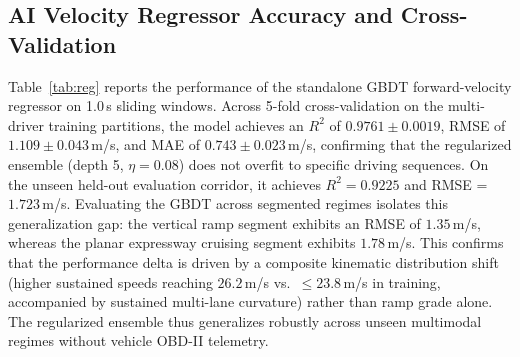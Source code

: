 \documentclass[conference]{IEEEtran}
\begin{document}
\subsection{AI Velocity Regressor Accuracy and Cross-Validation}
Table~\ref{tab:reg} reports the performance of the standalone GBDT forward-velocity regressor on 1.0\,s sliding windows. Across 5-fold cross-validation on the multi-driver training partitions, the model achieves an $R^2$ of $0.9761 \pm 0.0019$, RMSE of $1.109 \pm 0.043$\,m/s, and MAE of $0.743 \pm 0.023$\,m/s, confirming that the regularized ensemble (depth 5, $\eta=0.08$) does not overfit to specific driving sequences. On the unseen held-out evaluation corridor, it achieves $R^2 = 0.9225$ and RMSE = $1.723$\,m/s. Evaluating the GBDT across segmented regimes isolates this generalization gap: the vertical ramp segment exhibits an RMSE of $1.35$\,m/s, whereas the planar expressway cruising segment exhibits $1.78$\,m/s. This confirms that the performance delta is driven by a composite kinematic distribution shift (higher sustained speeds reaching $26.2$\,m/s vs.\ $\le 23.8$\,m/s in training, accompanied by sustained multi-lane curvature) rather than ramp grade alone. The regularized ensemble thus generalizes robustly across unseen multimodal regimes without vehicle OBD-II telemetry.

\begin{table}[!htbp]
\centering
\caption{AI Velocity Regressor Cross-Validation and Test Performance}
\label{tab:reg}
\footnotesize
\renewcommand{\arraystretch}{1.1}
\setlength{\tabcolsep}{3.5pt}
\end{table}
\end{document}
